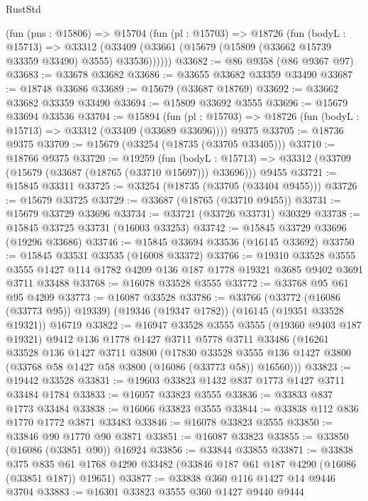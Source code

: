 \begin{lexlean}{RustStd}
\begin{coremodule}
    (fun (pns : @15806) =>
    @15704
      (fun (pl : @15703) =>
      @18726
        (fun (bodyL : @15713) =>
        @33312 (@33409 (@33661 (@15679 (@15809 (@33662 @15739 @33359 @33490) @3555) @33536))))))
@33682 := @86 @9358 (@86 @9367 @97)
@33683 := @33678 @33682
@33686 := @33655 @33682 @33359 @33490
@33687 := @18748 @33686
@33689 := @15679 (@33687 @18769)
@33692 := @33662 @33682 @33359 @33490
@33694 := @15809 @33692 @3555
@33696 := @15679 @33694 @33536
@33704 := @15894
    (fun (pl : @15703) => @18726 (fun (bodyL : @15713) => @33312 (@33409 (@33689 @33696))))
    @9375
@33705 := @18736 @9375
@33709 := @15679 (@33254 (@18735 (@33705 @33405)))
@33710 := @18766 @9375
@33720 := @19259
    (fun (bodyL : @15713) => @33312 (@33709 (@15679 (@33687 (@18765 (@33710 @15697))) @33696)))
    @9455
@33721 := @15845 @33311
@33725 := @33254 (@18735 (@33705 (@33404 @9455)))
@33726 := @15679 @33725
@33729 := @33687 (@18765 (@33710 @9455))
@33731 := @15679 @33729 @33696
@33734 := @33721 (@33726 @33731) @30329
@33738 := @15845 @33725 @33731 (@16003 @33253)
@33742 := @15845 @33729 @33696 (@19296 @33686)
@33746 := @15845 @33694 @33536 (@16145 @33692)
@33750 := @15845 @33531 @33535 (@16008 @33372)
@33766 := @19310
    @33528
    @3555
    @3555
    @1427
    @114
    @1782
    @4209
    @136
    @187
    @1778
    @19321
    @3685
    @9402
    @3691
    @3711
    @33488
@33768 := @16078 @33528 @3555
@33772 := @33768 @95 @61 @95 @4209
@33773 := @16087 @33528
@33786 := @33766
    (@33772 (@16086 (@33773 @95)) @19339)
    (@19346 (@19347 @1782))
    (@16145 (@19351 @33528 @19321))
    @16719
@33822 := @16947
    @33528
    @3555
    @3555
    (@19360 @9403 @187 @19321)
    @9412
    @136
    @1778
    @1427
    @3711
    @5778
    @3711
    @33486
    (@16261
      @33528
      @136
      @1427
      @3711
      @3800
      (@17830
        @33528
        @3555
        @136
        @1427
        @3800
        (@33768 @58 @1427 @58 @3800 (@16086 (@33773 @58)) @16560)))
@33823 := @19442 @33528
@33831 := @19603 @33823 @1432 @837 @1773 @1427 @3711 @33484 @1784
@33833 := @16057 @33823 @3555
@33836 := @33833 @837 @1773 @33484
@33838 := @16066 @33823 @3555
@33844 := @33838 @112 @836 @1770 @1772 @3871 @33483
@33846 := @16078 @33823 @3555
@33850 := @33846 @90 @1770 @90 @3871
@33851 := @16087 @33823
@33855 := @33850 (@16086 (@33851 @90)) @16924
@33856 := @33844 @33855
@33871 := @33838
    @375
    @835
    @61
    @1768
    @4290
    @33482
    (@33846 @187 @61 @187 @4290 (@16086 (@33851 @187)) @19651)
@33877 := @33838 @360 @116 @1427 @14 @9446 @3704
@33883 := @16301 @33823 @3555 @360 @1427 @9440 @9444

\end{coremodule}
\end{lexlean}
